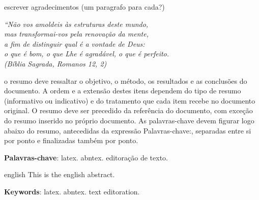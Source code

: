 \documentclass[
12pt,				%
openany,			%
oneside,			%
a4paper,			%
english,			%
french,				%
spanish,			%
brazil				%
]{abntex2}
\begin{document}
	\begin{agradecimentos}
	escrever agradecimentos (um paragrafo para cada?)
		
	\end{agradecimentos}
	
	\begin{epigrafe}
		\vspace*{\fill}
		\begin{flushright}
			\textit{``Não vos amoldeis às estruturas deste mundo, \\
				mas transformai-vos pela renovação da mente, \\
				a fim de distinguir qual é a vontade de Deus: \\
				o que é bom, o que Lhe é agradável, o que é perfeito.\\
				(Bíblia Sagrada, Romanos 12, 2)}
		\end{flushright}
	\end{epigrafe}
	
	
	\setlength{\absparsep}{18pt} %
	\begin{resumo}
		o resumo deve ressaltar o
		objetivo, o método, os resultados e as conclusões do documento. A ordem e a extensão
		destes itens dependem do tipo de resumo (informativo ou indicativo) e do
		tratamento que cada item recebe no documento original. O resumo deve ser
		precedido da referência do documento, com exceção do resumo inserido no
		próprio documento. As palavras-chave devem figurar logo abaixo do
		resumo, antecedidas da expressão Palavras-chave:, separadas entre si por
		ponto e finalizadas também por ponto.
		
		\textbf{Palavras-chave}: latex. abntex. editoração de texto.
	\end{resumo}
	
	\begin{resumo}[abstract]
		\begin{otherlanguage*}{english}
			This is the english abstract.
			
			\vspace{\onelineskip}
			
			\noindent 
			\textbf{Keywords}: latex. abntex. text editoration.
		\end{otherlanguage*}
	\end{resumo}
	
\end{document}
